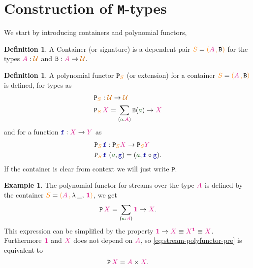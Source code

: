 \documentclass[twoside,11pt,openright]{report}
\theoremstyle{plain} %
\theoremstyle{definition}
\newtheorem{defn}[thm]{Definition}%
\newtheorem{exmp}{Example} %
\theoremstyle{remark}
\newcommand*{\term}[1]{\textcolor{green!30!black}{#1}} %
\newcommand*{\type}[1]{\textcolor{magenta!90!black}{#1}}
\newcommand*{\container}[1]{\textcolor{orange}{#1}}
\newcommand*{\containerpair}[2]{\ensuremath{\colorlet{savedleftcolor}{.}\color{orange}\left(\color{savedleftcolor}#1\,\textcolor{orange}{\mathbf{,}}\,#2\color{orange}\right)\color{savedleftcolor}}}
\newcommand*{\containerpairsimple}[2]{\containerpair{#1}{\lambda\,\_,\,#2}}
\newcommand*{\universe}[1]{\textcolor{orange!80!black}{#1}}
\newcommand*{\unit}{\type{\textbf{1}}}
\newcommand*{\function}[1]{\textcolor{blue!60!black}{\ensuremath{\mathtt{#1}}}}
\newcommand*{\typeformer}[1]{\ensuremath{\mathtt{#1}}}
\newcommand*{\functor}[1]{\ensuremath{\mathbf{\mathtt{#1}}}}
\begin{document}
\section{Construction of \texttt{M}-types}
We start by introducing containers and polynomial functors, 
\begin{defn}
  A Container (or signature) is a dependent pair \(\container{S} = \containerpair{\type{A}}{\typeformer{B}}\) for the types \(\type{A} : \universe{\mathcal{U}}\) and \(\typeformer{B} : \type{A} \rightarrow \universe{\mathcal{U}}\). 
\end{defn}
\begin{defn}
  A polynomial functor \(\functor{P}_{\container{S}}\) (or extension) for a container \(\container{S} = \containerpair{\type{A}}{\typeformer{B}}\) is defined, for types as
  \begin{equation}
    \begin{aligned}
      &\functor{P}_{\container{S}} : \universe{\mathcal{U}} \rightarrow \universe{\mathcal{U}} \\
      &\functor{P}_{\container{S}}\,\type{X} = \sum_{(\term{a} : \type{A})} \typeformer{B}(\term{a}) \rightarrow \type{X}
    \end{aligned}
  \end{equation}
  and for a function \(\function{f} : \type{X} \rightarrow \type{Y}\) as
  \begin{equation}
    \begin{aligned}
      &\functor{P}_{\container{S}}\,\function{f} : \functor{P}_{\container{S}}\type{X} \rightarrow \functor{P}_{\container{S}}\type{Y} \\
      &\functor{P}_{\container{S}}\,\function{f}~(\term{a},\function{g}) = (\term{a}, \function{f} \circ \function{g}).
    \end{aligned}
  \end{equation}
  If the container is clear from context we will just write \(\functor{P}\).
\end{defn}
\begin{exmp}
  \label{exmp:stream-polyfunctor-example}
  The polynomial functor for streams over the type \(\type{A}\) is defined by the container \(\container{S} = \containerpairsimple{\type{A}}{\unit}\), we get
  \begin{equation}
    \label{eq:stream-polyfunctor-pre}
    \functor{P}\,\type{X} = \sum_{(\term{a} : \type{A})} \unit \rightarrow \type{X}.
  \end{equation}
  This expression can be simplified by the property \(\unit \rightarrow \type{X} \equiv \type{X}^{\unit} \equiv \type{X}\). Furthermore \(\unit\) and \(\type{X}\) does not depend on \(\type{A}\), so \eqref{eq:stream-polyfunctor-pre} is equivalent to
  \begin{equation}
    \functor{P}\,\type{X} = \type{A} \times \type{X}.
  \end{equation}
\end{exmp}
\end{document}

